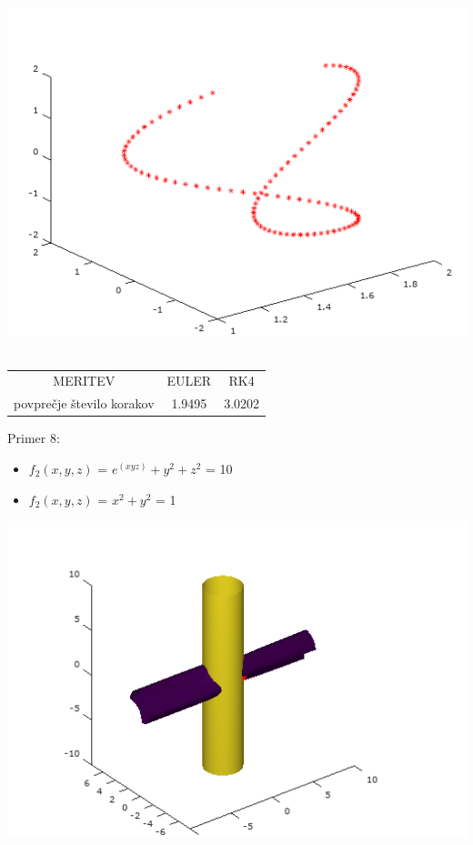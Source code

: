 \documentclass[]{article}
\begin{document}
	\includegraphics[scale=0.3]{primer7_4} \\ \\
	\begin{center}
	\begin{tabular}{ |c|c|c| } 
 		\hline
 			MERITEV & EULER & RK4 \\ 
			povpre\v{c}je \v{s}tevilo korakov & 1.9495 & 3.0202 \\ 
 		\hline
 	\end{tabular}
	\end{center}
	Primer 8:
	\begin{itemize}  
		\item $f_{2}(x,y,z)$ = $e^{(xyz)}+y^{2}+z^{2}$ = 10
		\item $f_{2}(x,y,z)$ =  $x^2 + y^2$ = 1
	\end{itemize}
	\includegraphics[scale=0.3]{primer8_1}
\end{document}
